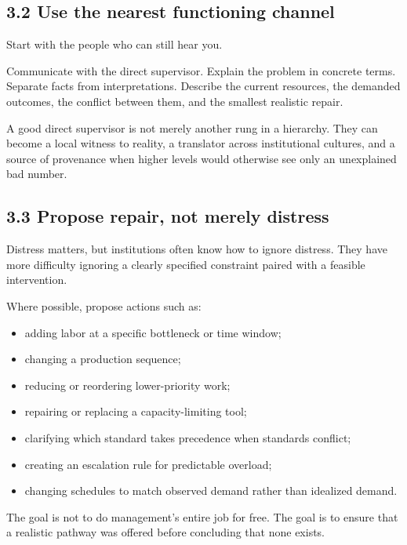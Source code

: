 \documentclass[11pt,oneside]{article}
\providecommand{\tightlist}{%
  \setlength{\itemsep}{0.22em}\setlength{\parskip}{0pt}}
\begin{document}
\subsection{3.2 Use the nearest functioning
channel}\label{use-the-nearest-functioning-channel}

Start with the people who can still hear you.

Communicate with the direct supervisor. Explain the problem in concrete
terms. Separate facts from interpretations. Describe the current
resources, the demanded outcomes, the conflict between them, and the
smallest realistic repair.

A good direct supervisor is not merely another rung in a hierarchy. They
can become a local witness to reality, a translator across institutional
cultures, and a source of provenance when higher levels would otherwise
see only an unexplained bad number.

\subsection{3.3 Propose repair, not merely
distress}\label{propose-repair-not-merely-distress}

Distress matters, but institutions often know how to ignore distress.
They have more difficulty ignoring a clearly specified constraint paired
with a feasible intervention.

Where possible, propose actions such as:

\begin{itemize}
\tightlist
\item
  adding labor at a specific bottleneck or time window;
\item
  changing a production sequence;
\item
  reducing or reordering lower-priority work;
\item
  repairing or replacing a capacity-limiting tool;
\item
  clarifying which standard takes precedence when standards conflict;
\item
  creating an escalation rule for predictable overload;
\item
  changing schedules to match observed demand rather than idealized
  demand.
\end{itemize}

The goal is not to do management's entire job for free. The goal is to
ensure that a realistic pathway was offered before concluding that none
exists.
\end{document}
